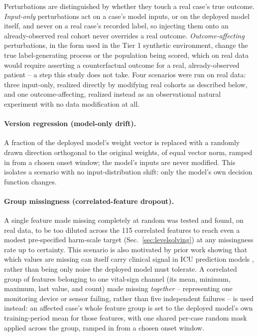 \documentclass[preprintsapa,article,submit,oneauthor]{Definitions/mdpi}
\begin{document}
Perturbations are distinguished by whether they touch a real case's true outcome. \emph{Input-only} perturbations act on a case's model inputs, or on the deployed model itself, and never on a real case's recorded label, so injecting them onto an already-observed real cohort never overrides a real outcome. \emph{Outcome-affecting} perturbations, in the form used in the Tier 1 synthetic environment, change the true label-generating process or the population being scored, which on real data would require asserting a counterfactual outcome for a real, already-observed patient -- a step this study does not take. Four scenarios were run on real data: three input-only, realized directly by modifying real cohorts as described below, and one outcome-affecting, realized instead as an observational natural experiment with no data modification at all.

\paragraph{Version regression (model-only drift).} A fraction of the deployed model's weight vector is replaced with a randomly drawn direction orthogonal to the original weights, of equal vector norm, ramped in from a chosen onset window; the model's inputs are never modified. This isolates a scenario with no input-distribution shift: only the model's own decision function changes.

\paragraph{Group missingness (correlated-feature dropout).} A single feature made missing completely at random was tested and found, on real data, to be too diluted across the 115 correlated features to reach even a modest pre-specified harm-scale target (Sec.~\ref{sec:levelsolving}) at any missingness rate up to certainty. This scenario is also motivated by prior work showing that which values are missing can itself carry clinical signal in ICU prediction models \citep{yu2026missingness}, rather than being only noise the deployed model must tolerate. A correlated group of features belonging to one vital-sign channel (its mean, minimum, maximum, last value, and count) made missing \emph{together} -- representing one monitoring device or sensor failing, rather than five independent failures -- is used instead: an affected case's whole feature group is set to the deployed model's own training-period mean for those features, with one shared per-case random mask applied across the group, ramped in from a chosen onset window.
\end{document}
